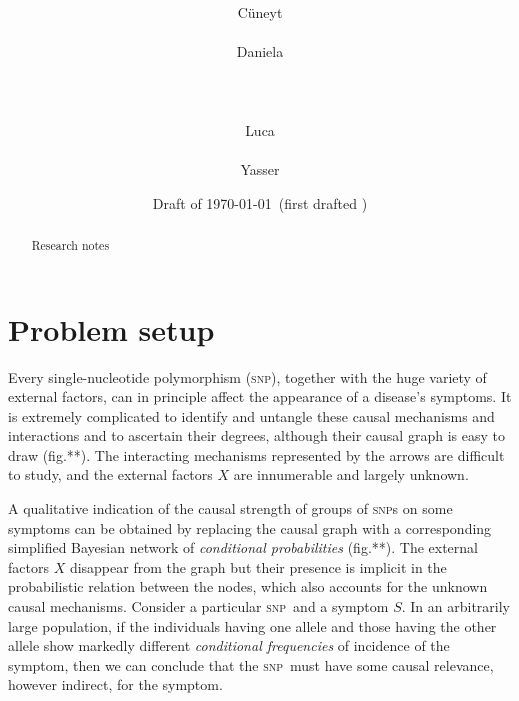 \documentclass[\ifafour a4paper,12pt,\else a5paper,10pt,\fi%
onecolumn,oneside,article,%
british%
]{memoir}
\title{\propertitle%
}
\author{%
\hspace*{\stretch{1}}%
\parbox{0.5\linewidth}%
{\protect\centering C\"uneyt\\%
\footnotesize\epost{\email{cuneyt.guzey}{ntnu.no}}}%
\hspace*{\stretch{1}}%
\parbox{0.5\linewidth}%
{\protect\centering Daniela\\%
\footnotesize\epost{\email{daniela.bragantini}{ntnu.no}}}%
\hspace*{\stretch{1}}%
\\[\jot]\hspace*{\stretch{1}}%
\parbox{0.5\linewidth}%
{\protect\centering Luca\\%
\footnotesize\epost{\email{piero.mana}{ntnu.no}}}%
\hspace*{\stretch{1}}%
\parbox{0.5\linewidth}%
{\protect\centering Yasser\\%
\footnotesize\epost{\email{yasser.roudi}{ntnu.no}}}%
\hspace*{\stretch{1}}%
}
\date{Draft of \today\ (first drafted \firstdraft)}
\theoremstyle{remark}
\theoremstyle{innote}
\newcommand*{\citep}{\parencites}
\newcommand*{\asudedication}[1]{%
{\par\centering\textit{#1}\par}}
\renewcommand*{\|}{\mathpunct{|}}
\newcommand*{\fig}{fig.}%
\newcommand*{\snp}{\textsc{snp}}
\begin{document}
\captiondelim{\quad}\captionnamefont{\footnotesize}\captiontitlefont{\footnotesize}
\frenchspacing

\maketitle
\ifpublic
\abstractrunin
\abslabeldelim{}
\renewcommand*{\abstractname}{}
\setlength{\absleftindent}{0pt}
\setlength{\absrightindent}{0pt}
\setlength{\abstitleskip}{-\absparindent}
\begin{abstract}%
  \noindent Research notes
\end{abstract}\fi

\frenchspacing

\section{Problem setup}
\label{sec:intro}

Every single-nucleotide polymorphism (\snp), together with the huge variety
of external factors, can in principle affect the appearance of a disease's
symptoms. It is extremely complicated to identify and untangle these causal
mechanisms and interactions and to ascertain their degrees, although their
causal graph \citep{pearl2000_r2009} is easy to draw (\fig**). The
interacting mechanisms represented by the arrows are difficult to study,
and the external factors $X$ are innumerable and largely unknown.

A qualitative indication of the causal strength of groups of \snp s on some
symptoms can be obtained by replacing the causal graph with a corresponding
simplified Bayesian network \citep{pearl2000_r2009} of \emph{conditional
  probabilities} (\fig**). The external factors $X$ disappear from the
graph but their presence is implicit in the probabilistic relation between
the nodes, which also accounts for the unknown causal mechanisms. Consider
a particular \snp\ and a symptom $S$. In an arbitrarily large population, if
the individuals having one allele and those having the other allele show
markedly different \emph{conditional frequencies} of incidence of the
symptom, then we can conclude that the \snp\ must have some causal relevance,
however indirect, for the symptom.
\end{document}

